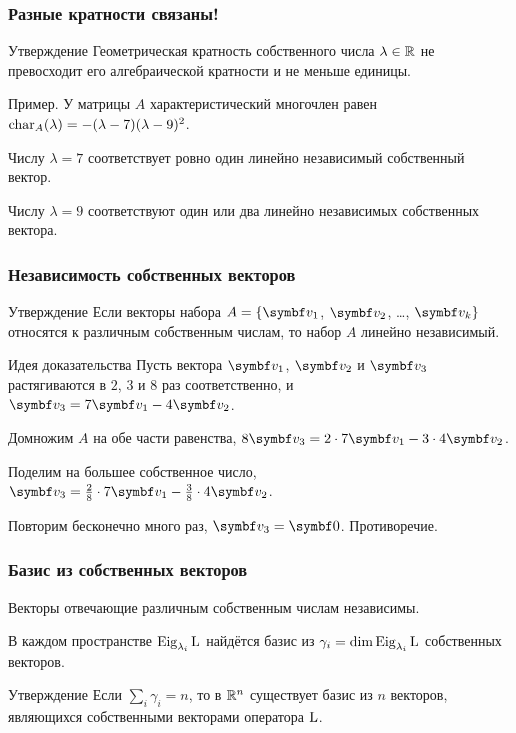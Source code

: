 \begin{frame}
\frametitle{Разные кратности связаны!}

\begin{block}{Утверждение}
    Геометрическая кратность собственного числа $\lambda\in \mathbb{R}$ не превосходит его алгебраической кратности и не меньше единицы.     
\end{block}

\pause
Пример. У матрицы $A$ характеристический многочлен равен $\operatorname{char}_A(\lambda) = -(\lambda- 7)(\lambda - 9)^2$. \pause

Числу $\lambda =7$ соответствует ровно один линейно независимый собственный вектор.\pause

Числу $\lambda =9$ соответствуют один или два линейно независимых собственных вектора. 

\end{frame}


\begin{frame}
    \frametitle{Независимость собственных векторов}

    \begin{block}{Утверждение}
        Если векторы набора $A = \{\bv_1$, $\bv_2$, \ldots, $\bv_k\}$ относятся к различным
        собственным числам, то набор $A$ линейно независимый.
    \end{block}
    \pause
    \begin{block}{Идея доказательства}
        Пусть вектора $\bv_1$, $\bv_2$ и $\bv_3$ растягиваются в $2$, $3$ и $8$ раз соответственно, 
        и $\bv_3 = 7\bv_1 - 4 \bv_2$.\pause

        Домножим $A$ на обе части равенства, $8\bv_3 = 2 \cdot 7\bv_1 - 3\cdot 4\bv_2$.\pause

        Поделим на большее собственное число, $\bv_3 = \frac{2}{8} \cdot 7\bv_1 - \frac{3}{8}\cdot 4\bv_2$. \pause
        
        Повторим бесконечно много раз, $\bv_3 = \bzero$.
        Противоречие.
        
    \end{block}

    

\end{frame}




\begin{frame}
    \frametitle{Базис из собственных векторов}
    Векторы отвечающие различным собственным числам независимы.
    \pause 

    В каждом пространстве $\operatorname{Eig}_{\lambda_i}\operatorname{L}$ найдётся базис из
     $\gamma_i = \dim \operatorname{Eig}_{\lambda_i}\operatorname{L}$ собственных векторов.
     \pause

    \begin{block}{Утверждение}
Если $\sum_i \gamma_i = n$, то в $\mathbb{R}^n$ существует базис 
из $n$ векторов, являющихся собственными векторами оператора $\operatorname{L}$.            
    \end{block}

\end{frame}


